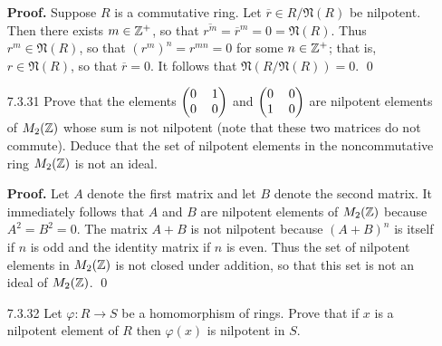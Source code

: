 \begin{enumerate}
      \textbf{Proof.} Suppose $R$ is a commutative ring. Let
      $\overline{r} \in R/\mathfrak{N}(R)$ be nilpotent. Then there exists
      $m \in \mathbb{Z}^+$, so that
      $\overline{r^m} = \overline{r}^m = 0 = \mathfrak{N}(R)$. Thus
      $r^m \in \mathfrak{N}(R)$, so that $(r^m)^n = r^{mn} = 0$ for some
      $n \in \mathbb{Z}^+$; that is, $r \in \mathfrak{N}(R)$, so that
      $\overline{r} = 0$. It follows that $\mathfrak{N}(R/\mathfrak{N}(R)) = 0$.
      \qed
   \item[7.3.31]  Prove that the elements $\left(\begin{tabular}{@{}cc@{}}
                     0 & 1 \\
                     0 & 0
                  \end{tabular}\right)$ and $\left(\begin{tabular}{@{}cc@{}}
                     0 & 0 \\
                     1 & 0
                  \end{tabular}\right)$ are nilpotent elements of $M_2(\mathbb{Z})$
                  whose sum is not nilpotent (note that these two matrices do
                  not commute). Deduce that the set of nilpotent elements in the
                  noncommutative ring $M_2(\mathbb{Z})$ is not an ideal.

      \textbf{Proof.} Let $A$ denote the first matrix and let $B$ denote the
      second matrix. It immediately follows that $A$ and $B$ are nilpotent
      elements of $M_2(\mathbb{Z})$ because $A^2 = B^2 = 0$. The matrix $A + B$ is not
      nilpotent because $(A + B)^n$ is itself if $n$ is odd and the identity
      matrix if $n$ is even. Thus the set of nilpotent elements in $M_2(\mathbb{Z})$ is
      not closed under addition, so that this set is not an ideal of $M_2(\mathbb{Z})$.
      \qed
   \item[7.3.32]  Let $\varphi : R \rightarrow S$ be a homomorphism of rings.
                  Prove that if $x$ is a nilpotent element of $R$ then
                  $\varphi(x)$ is nilpotent in $S$.


\end{enumerate}

